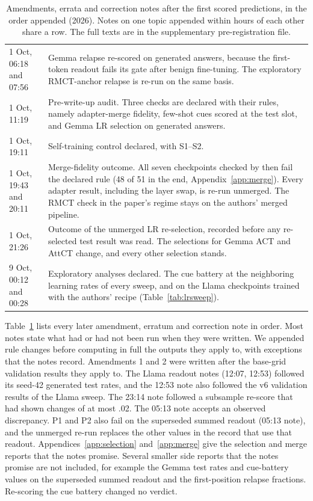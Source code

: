 \documentclass[11pt]{article}
\newcommand{\gemma}{Gemma}\newcommand{\gemmafull}{Gemma-2-2B-it}
\newcommand{\llama}{Llama}\newcommand{\llamafull}{Llama-3.1-8B-Instruct}
\begin{document}
\begin{table}[t]
\begin{tabular}{l p{12.7cm}}
1 Oct, 06:18 and 07:56 & \gemma{} relapse re-scored on generated answers, because the first-token readout fails its gate after benign fine-tuning. The exploratory RMCT-anchor relapse is re-run on the same basis. \\
1 Oct, 11:19 & Pre-write-up audit. Three checks are declared with their rules, namely adapter-merge fidelity, few-shot cues scored at the test slot, and \gemma{} LR selection on generated answers. \\
1 Oct, 19:11 & Self-training control declared, with S1--S2. \\
1 Oct, 19:43 and 20:11 & Merge-fidelity outcome. All seven checkpoints checked by then fail the declared rule (48 of 51 in the end, Appendix~\ref{app:merge}). Every adapter result, including the layer swap, is re-run unmerged. The RMCT check in the paper's regime stays on the authors' merged pipeline. \\
1 Oct, 21:26 & Outcome of the unmerged LR re-selection, recorded before any re-selected test result was read. The selections for \gemma{} ACT and AttCT change, and every other selection stands. \\
9 Oct, 00:12 and 00:28 & Exploratory analyses declared. The cue battery at the neighboring learning rates of every sweep, and on the \llama{} checkpoints trained with the authors' recipe (Table~\ref{tab:lrsweep}). \\
\bottomrule
\end{tabular}
\caption{Amendments, errata and correction notes after the first scored predictions, in the order appended (2026). Notes on one topic appended within hours of each other share a row. The full texts are in the supplementary pre-registration file.}
\label{tab:amend}
\end{table}
Table~\ref{tab:amend} lists every later amendment, erratum and correction note in order. Most notes state what had or had not been run when they were written. We appended rule changes before computing in full the outputs they apply to, with exceptions that the notes record. Amendments 1 and 2 were written after the base-grid validation results they apply to. The \llama{} readout notes (12:07, 12:53) followed its seed-42 generated test rates, and the 12:53 note also followed the v6 validation results of the \llama{} sweep. The 23:14 note followed a subsample re-score that had shown changes of at most .02. The 05:13 note accepts an observed discrepancy. P1 and P2 also fail on the superseded summed readout (05:13 note), and the unmerged re-run replaces the other values in the record that use that readout. Appendices~\ref{app:selection} and~\ref{app:merge} give the selection and merge reports that the notes promise. Several smaller side reports that the notes promise are not included, for example the \gemma{} test rates and cue-battery values on the superseded summed readout and the first-position relapse fractions. Re-scoring the cue battery changed no verdict.
\end{document}
